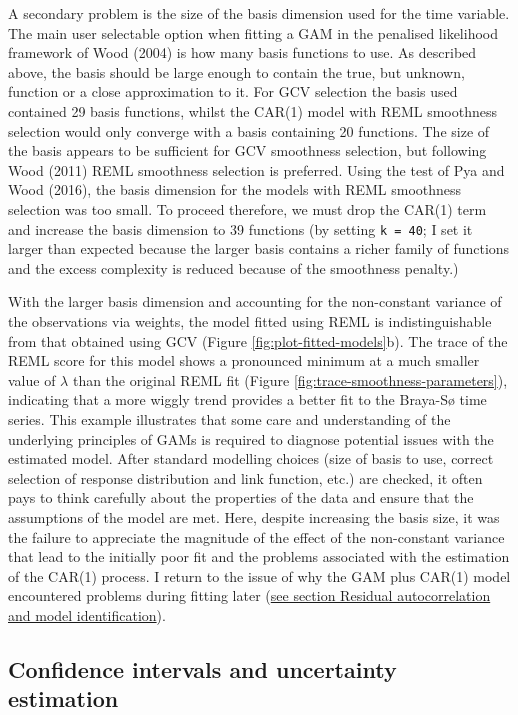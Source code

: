 \documentclass[12pt,]{article}
\begin{document}
A secondary problem is the size of the basis dimension used for the time
variable. The main user selectable option when fitting a GAM in the
penalised likelihood framework of Wood (2004) is how many basis
functions to use. As described above, the basis should be large enough
to contain the true, but unknown, function or a close approximation to
it. For GCV selection the basis used contained 29 basis functions,
whilst the CAR(1) model with REML smoothness selection would only
converge with a basis containing 20 functions. The size of the basis
appears to be sufficient for GCV smoothness selection, but following
Wood (2011) REML smoothness selection is preferred. Using the test of
Pya and Wood (2016), the basis dimension for the models with REML
smoothness selection was too small. To proceed therefore, we must drop
the CAR(1) term and increase the basis dimension to 39 functions (by
setting \texttt{k\ =\ 40}; I set it larger than expected because the
larger basis contains a richer family of functions and the excess
complexity is reduced because of the smoothness penalty.)

With the larger basis dimension and accounting for the non-constant
variance of the observations via weights, the model fitted using REML is
indistinguishable from that obtained using GCV (Figure
\ref{fig:plot-fitted-models}b). The trace of the REML score for this
model shows a pronounced minimum at a much smaller value of \(\lambda\)
than the original REML fit (Figure
\ref{fig:trace-smoothness-parameters}), indicating that a more wiggly
trend provides a better fit to the Braya-Sø time series. This example
illustrates that some care and understanding of the underlying
principles of GAMs is required to diagnose potential issues with the
estimated model. After standard modelling choices (size of basis to use,
correct selection of response distribution and link function, etc.) are
checked, it often pays to think carefully about the properties of the
data and ensure that the assumptions of the model are met. Here, despite
increasing the basis size, it was the failure to appreciate the
magnitude of the effect of the non-constant variance that lead to the
initially poor fit and the problems associated with the estimation of
the CAR(1) process. I return to the issue of why the GAM plus CAR(1)
model encountered problems during fitting later
(\protect\hyperlink{identifiability}{see section Residual
autocorrelation and model identification}).

\hypertarget{confints}{\subsection{Confidence intervals and uncertainty
estimation}\label{confints}}
\end{document}

